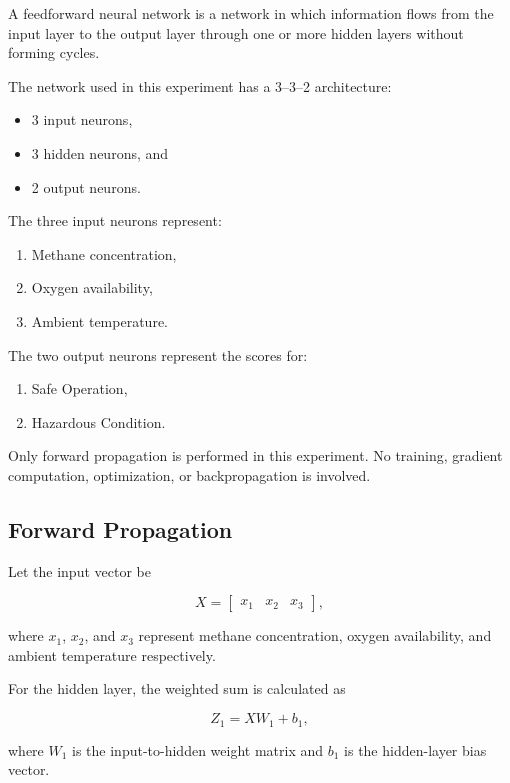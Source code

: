 \documentclass[12pt]{article}
\begin{document}
A feedforward neural network is a network in which information flows
from the input layer to the output layer through one or more hidden
layers without forming cycles.

The network used in this experiment has a 3--3--2 architecture:

\begin{itemize}
    \item 3 input neurons,
    \item 3 hidden neurons, and
    \item 2 output neurons.
\end{itemize}

The three input neurons represent:

\begin{enumerate}
    \item Methane concentration,
    \item Oxygen availability,
    \item Ambient temperature.
\end{enumerate}

The two output neurons represent the scores for:

\begin{enumerate}
    \item Safe Operation,
    \item Hazardous Condition.
\end{enumerate}

Only forward propagation is performed in this experiment. No training,
gradient computation, optimization, or backpropagation is involved.

\subsection{Forward Propagation}

Let the input vector be

\[
X =
\begin{bmatrix}
x_1 & x_2 & x_3
\end{bmatrix},
\]

where $x_1$, $x_2$, and $x_3$ represent methane concentration,
oxygen availability, and ambient temperature respectively.

For the hidden layer, the weighted sum is calculated as

\[
Z_1 = XW_1 + b_1,
\]

where $W_1$ is the input-to-hidden weight matrix and $b_1$ is the
hidden-layer bias vector.
\end{document}
